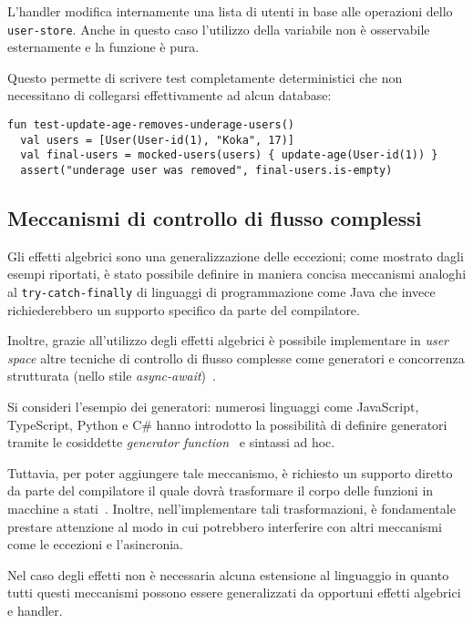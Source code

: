 L'handler modifica internamente una lista di utenti in base alle operazioni dello \lstinline{user-store}. Anche in questo caso l'utilizzo della variabile non è osservabile esternamente e la funzione è pura.

Questo permette di scrivere test completamente deterministici che non necessitano di collegarsi effettivamente ad alcun database:
\begin{lstlisting}[language=koka]
fun test-update-age-removes-underage-users()
  val users = [User(User-id(1), "Koka", 17)]
  val final-users = mocked-users(users) { update-age(User-id(1)) }
  assert("underage user was removed", final-users.is-empty)
\end{lstlisting}

\subsection{Meccanismi di controllo di flusso complessi}
Gli effetti algebrici sono una generalizzazione delle eccezioni; come mostrato dagli esempi riportati, è stato possibile definire in maniera concisa meccanismi analoghi al \lstinline{try-catch-finally} di linguaggi di programmazione come Java che invece richiederebbero un supporto specifico da parte del compilatore.

Inoltre, grazie all'utilizzo degli effetti algebrici è possibile implementare in \emph{user space} altre tecniche di controllo di flusso complesse come generatori e concorrenza strutturata (nello stile \emph{async-await})~\cite{cit:structured-asynchrony-with-algebraic-effects}.

Si consideri l'esempio dei generatori: numerosi linguaggi come JavaScript, TypeScript, Python e C\# hanno introdotto la possibilità di definire generatori tramite le cosiddette \emph{generator function}~\cite{cit:yield-statement-c-sharp,cit:yield-statement-javascript,cit:yield-statement-python} e sintassi ad hoc.

Tuttavia, per poter aggiungere tale meccanismo, è richiesto un supporto diretto da parte del compilatore il quale dovrà trasformare il corpo delle funzioni in macchine a stati~\cite{cit:iterators-technical-implementation}. Inoltre, nell'implementare tali trasformazioni, è fondamentale prestare attenzione al modo in cui potrebbero interferire con altri meccanismi come le eccezioni e l'asincronia.

Nel caso degli effetti non è necessaria alcuna estensione al linguaggio in quanto tutti questi meccanismi possono essere generalizzati da opportuni effetti algebrici e handler.

